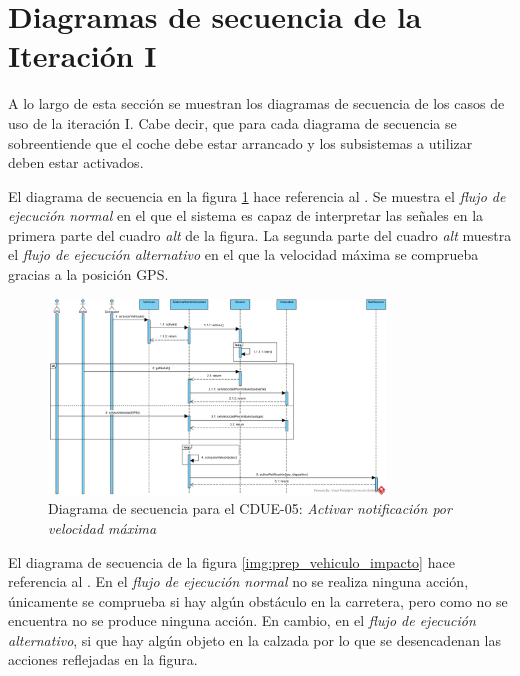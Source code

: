 \section{Diagramas de secuencia de la Iteración I}

\par A lo largo de esta sección se muestran los diagramas de secuencia de los casos de uso de la iteración I. Cabe decir, que para cada diagrama de secuencia se sobreentiende que el coche debe estar arrancado y los subsistemas a utilizar deben estar activados.

\par El diagrama de secuencia  en la figura \ref{img:notif_velocidad_max} hace referencia al . Se muestra el \textit{flujo de ejecución normal} en el que el sistema es capaz de interpretar las señales en la primera parte del cuadro \textit{alt} de la figura. La segunda parte del cuadro \textit{alt} muestra el \textit{flujo de ejecución alternativo} en el que la velocidad máxima se comprueba gracias a la posición GPS.

\begin{figure}[h]
  \begin{center}
    \includegraphics[width=0.8\textwidth]{./img/diagramas_de_secuencia/CDUE-05.png}
  \end{center}
  \caption{Diagrama de secuencia para el CDUE-05: \textit{Activar notificación por velocidad máxima}}
  \label{img:notif_velocidad_max}
\end{figure}

\clearpage

\par El diagrama de secuencia de la figura \ref{img:prep_vehiculo_impacto} hace referencia al . En el \textit{flujo de ejecución normal} no se realiza ninguna acción, únicamente se comprueba si hay algún obstáculo en la carretera, pero como no se encuentra no se produce ninguna acción. En cambio, en el \textit{flujo de ejecución alternativo}, si que hay algún objeto en la calzada por lo que se desencadenan las acciones reflejadas en la figura.

